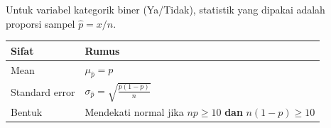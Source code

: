 \documentclass[
  indonesian,
  letterpaper,
]{book}
\newcounter{none} %
\begin{document}
Untuk variabel kategorik biner (Ya/Tidak), statistik yang dipakai adalah
proporsi sampel \(\hat{p} = x/n\).

{\def\LTcaptype{none} %
\begin{longtable}[]{@{}
  >{\raggedright\arraybackslash}p{}
  >{\raggedright\arraybackslash}p{}@{}}
\toprule\noalign{}
\begin{minipage}[b]{\linewidth}\raggedright
Sifat
\end{minipage} & \begin{minipage}[b]{\linewidth}\raggedright
Rumus
\end{minipage} \\
\midrule\noalign{}
\endhead
\bottomrule\noalign{}
\endlastfoot
Mean & \(\mu_{\hat{p}} = p\) \\
Standard error & \(\sigma_{\hat{p}} = \sqrt{\frac{p(1 - p)}{n}}\) \\
Bentuk & Mendekati normal jika \(np \geq 10\) \textbf{dan}
\(n(1 - p) \geq 10\) \\
\end{longtable}
}
\end{document}
